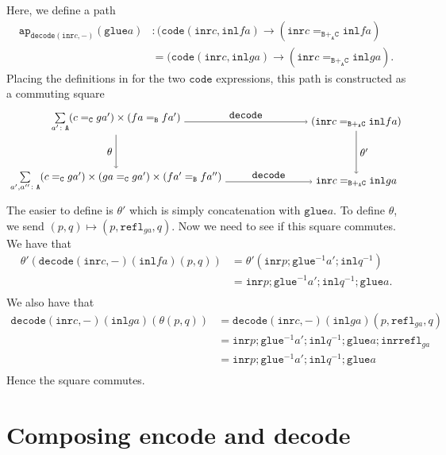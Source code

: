 \documentclass[12pt]{amsart}
\newcommand{\inv}{^{-1}}
\newcommand{\type}[1]{\mathtt{#1}}
\newcommand{\tin}{\colon}
\newcommand{\A}{\type{A}}
\newcommand{\B}{\type{B}}
\newcommand{\C}{\type{C}}
\newcommand{\BAC}{\B +_{\A} \C}
\newcommand{\ap}{\type{ap}}
\newcommand{\inl}{\type{inl}}
\newcommand{\inr}{\type{inr}}
\newcommand{\glue}{\type{glue}}
\newcommand{\refl}{\type{refl}}
\newcommand{\code}{\type{code}}
\newcommand{\decode}{\type{decode}}
\theoremstyle{remark}
\theoremstyle{definition}
\begin{document}
Here, we define a path
\begin{align*}
  \ap_{\decode ( \inr c , - )} (\glue a) &
  \tin
  ( \code ( \inr c , \inl fa ) \to ( \inr c =_{\BAC} \inl fa ) \\
  & =
  ( \code ( \inr c , \inl ga ) \to ( \inr c =_{\BAC} \inl ga ).
\end{align*}
Placing the definitions in for the two \( \code \) expressions, this
path is constructed as a commuting square
\[
  \begin{tikzpicture}
    \node (1) at (-4,1) {\( \sum\limits_{a' \tin \A} ( c =_{\C} ga' )
      \times ( fa =_{\B} fa' ) \)};
    \node (2) at (-4,-1) {\( \sum\limits_{a',a'' \tin \A} ( c =_{\C}
      ga' ) \times ( ga =_{\C} ga' ) \times ( fa' =_{\B} fa'' ) \)};
    \node (3) at (4,1) {\( ( \inr c =_{\BAC} \inl fa ) \)};
    \node (4) at (4,-1) {\( \inr c =_{\BAC} \inl ga \)};
    \draw [->] (1) to node [left] {\( \theta \)} (2);
    \draw [->] (1) to node [above] {\( \decode \)} (3);
    \draw [->] (2) to node [above] {\( \decode \)} (4);
    \draw [->] (3) to node [right] {\( \theta' \)} (4); 
  \end{tikzpicture}
\]
The easier to define is \( \theta' \) which is simply concatenation
with \( \glue a \).  To define \( \theta \), we send \( ( p,q )
\mapsto ( p, \refl_{ga} , q ) \).  Now we need to see if this square
commutes. We have that
\begin{align*}
  \theta' ( \decode ( \inr c , - ) ( \inl fa ) ( p,q ) )
  & = \theta' ( \inr p ; \glue^{-1} a' ; \inl q^{-1}  ) \\
  & = \inr p ; \glue^{-1} a' ; \inl q^{-1} ; \glue a. \\
\end{align*}
We also have that
\begin{align*}
  \decode ( \inr c , - ) ( \inl ga ) ( \theta ( p,q ) )
  & = \decode ( \inr c , - ) ( \inl ga ) ( p,\refl_{ga},q ) \\
  & =  \inr p ; \glue\inv a' ; \inl q\inv ; \glue a ; \inr \refl_{ga} \\
  & =  \inr p ; \glue\inv a' ; \inl q\inv ; \glue a  \\
\end{align*}
Hence the square commutes.


\section{Composing encode and decode}
\end{document}
